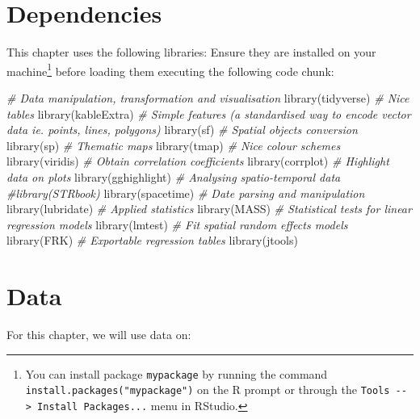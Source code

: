 \documentclass[
]{book}
\newenvironment{Shaded}{\begin{snugshade}}{\end{snugshade}}
\newcommand{\CommentTok}[1]{\textcolor[rgb]{0.56,0.35,0.01}{\textit{#1}}}
\newcommand{\FunctionTok}[1]{\textcolor[rgb]{0.00,0.00,0.00}{#1}}
\newcommand{\NormalTok}[1]{#1}
\begin{document}
\hypertarget{dependencies-7}{%
\section{Dependencies}\label{dependencies-7}}

This chapter uses the following libraries: Ensure they are installed on your machine\footnote{You can install package \texttt{mypackage} by running the command \texttt{install.packages("mypackage")} on the R prompt or through the \texttt{Tools\ -\/-\textgreater{}\ Install\ Packages...} menu in RStudio.} before loading them executing the following code chunk:

\begin{Shaded}
\begin{Highlighting}[]
\CommentTok{\# Data manipulation, transformation and visualisation}
\FunctionTok{library}\NormalTok{(tidyverse)}
\CommentTok{\# Nice tables}
\FunctionTok{library}\NormalTok{(kableExtra)}
\CommentTok{\# Simple features (a standardised way to encode vector data ie. points, lines, polygons)}
\FunctionTok{library}\NormalTok{(sf) }
\CommentTok{\# Spatial objects conversion}
\FunctionTok{library}\NormalTok{(sp) }
\CommentTok{\# Thematic maps}
\FunctionTok{library}\NormalTok{(tmap) }
\CommentTok{\# Nice colour schemes}
\FunctionTok{library}\NormalTok{(viridis) }
\CommentTok{\# Obtain correlation coefficients}
\FunctionTok{library}\NormalTok{(corrplot)}
\CommentTok{\# Highlight data on plots}
\FunctionTok{library}\NormalTok{(gghighlight)}
\CommentTok{\# Analysing spatio{-}temporal data}
\CommentTok{\#library(STRbook)}
\FunctionTok{library}\NormalTok{(spacetime)}
\CommentTok{\# Date parsing and manipulation}
\FunctionTok{library}\NormalTok{(lubridate)}
\CommentTok{\# Applied statistics}
\FunctionTok{library}\NormalTok{(MASS)}
\CommentTok{\# Statistical tests for linear regression models}
\FunctionTok{library}\NormalTok{(lmtest)}
\CommentTok{\# Fit spatial random effects models}
\FunctionTok{library}\NormalTok{(FRK)}
\CommentTok{\# Exportable regression tables}
\FunctionTok{library}\NormalTok{(jtools)}
\end{Highlighting}
\end{Shaded}

\hypertarget{data-6}{%
\section{Data}\label{data-6}}

For this chapter, we will use data on:
\end{document}
